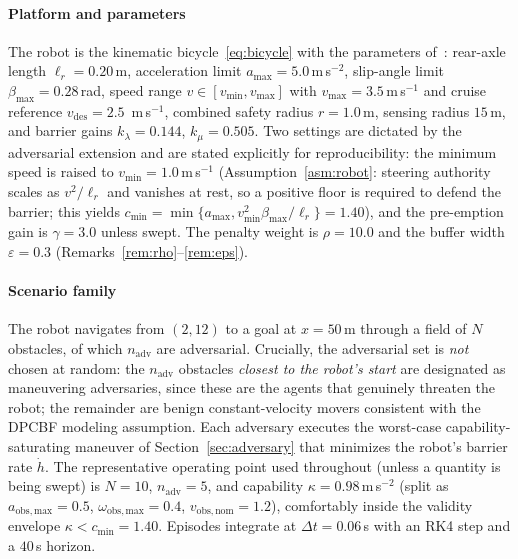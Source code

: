 \paragraph{Platform and parameters}
The robot is the kinematic bicycle~\eqref{eq:bicycle} with the parameters
of~\cite[Table~I]{park2026dpcbf}: rear-axle length $\ell_r=0.20$\,m,
acceleration limit $a_{\max}=5.0$\,m\,s$^{-2}$, slip-angle limit
$\beta_{\max}=0.28$\,rad, speed range $v\in[v_{\min},v_{\max}]$ with
$v_{\max}=3.5$\,m\,s$^{-1}$ and cruise reference $v_{\mathrm{des}}=2.5$\,
m\,s$^{-1}$, combined safety radius $r=1.0$\,m, sensing radius $15$\,m, and
barrier gains $k_\lambda=0.144$, $k_\mu=0.505$. Two settings are dictated by
the adversarial extension and are stated explicitly for reproducibility: the
minimum speed is raised to $v_{\min}=1.0$\,m\,s$^{-1}$
(Assumption~\ref{asm:robot}: steering authority scales as $v^2/\ell_r$ and
vanishes at rest, so a positive floor is required to defend the barrier; this
yields $c_{\min}=\min\{a_{\max},v_{\min}^2\beta_{\max}/\ell_r\}=1.40$), and
the pre-emption gain is $\gamma=3.0$ unless swept. The penalty weight is
$\rho=10.0$ and the buffer width $\varepsilon=0.3$
(Remarks~\ref{rem:rho}--\ref{rem:eps}).

\paragraph{Scenario family}
The robot navigates from $(2,12)$ to a goal at $x=50$\,m through a field of
$N$ obstacles, of which $n_{\mathrm{adv}}$ are adversarial. Crucially, the
adversarial set is \emph{not} chosen at random: the $n_{\mathrm{adv}}$
obstacles \emph{closest to the robot's start} are designated as maneuvering
adversaries, since these are the agents that genuinely threaten the robot;
the remainder are benign constant-velocity movers consistent with the DPCBF
modeling assumption. Each adversary executes the worst-case
capability-saturating maneuver of Section~\ref{sec:adversary} that minimizes
the robot's barrier rate $\dot h$. The representative operating point used
throughout (unless a quantity is being swept) is $N=10$, $n_{\mathrm{adv}}=5$,
and capability $\kappa=0.98$\,m\,s$^{-2}$ (split as
$a_{\mathrm{obs,max}}=0.5$, $\omega_{\mathrm{obs,max}}=0.4$,
$v_{\mathrm{obs,nom}}=1.2$), comfortably inside the validity envelope
$\kappa<c_{\min}=1.40$. Episodes integrate at $\Delta t=0.06$\,s with an RK4
step and a $40$\,s horizon.

